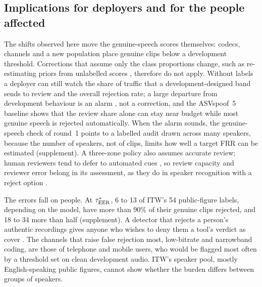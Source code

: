 \subsection{Implications for deployers and for the people affected}
The shifts observed here move the genuine-speech scores themselves: codecs, channels and a new population place genuine
clips below a development threshold. Corrections that assume only the class proportions change, such as re-estimating
priors from unlabelled scores \citep{saerens02_priors,lipton18_labelshift}, therefore do not apply. Without labels a
deployer can still watch the share of traffic that a development-designed band sends to review and the overall
rejection rate; a large departure from development behaviour is an alarm \citep{rabanser19_failing}, not a correction,
and the ASVspoof~5 baseline shows that the review share alone can stay near budget while most genuine speech is
rejected automatically. When the alarm sounds, the genuine-speech check of round~1 points to a labelled audit drawn
across many speakers, because the number of speakers, not of clips, limits how well a target FRR can be estimated
(supplement). A three-zone policy also assumes accurate review; human reviewers tend to defer to automated cues
\citep{skitka99_automation}, so review capacity and reviewer error belong in its assessment, as they do in speaker
recognition with a reject option \citep{ferrer19_failsafe}.

The errors fall on people. At \(\tau^{*}_{\mathrm{EER}}\), 6 to 13 of ITW's 54 public-figure labels, depending on the model, have more
than 90\% of their genuine clips rejected, and 18 to 34 more than half (supplement). A detector that rejects a person's
authentic recordings gives anyone who wishes to deny them a tool's verdict as cover \citep{chesney19_deepfakes}. The
channels that raise false rejection most, low-bitrate and narrowband coding, are those of telephone and mobile users,
who would be flagged most often by a threshold set on clean development audio. ITW's speaker pool, mostly English-speaking
public figures, cannot show whether the burden differs between groups of speakers.

